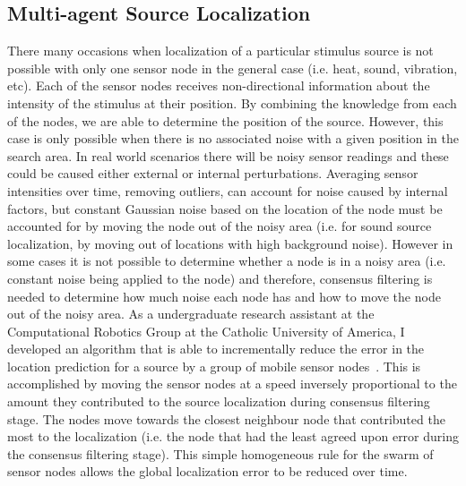 \documentclass{article}
\begin{document}
\subsection{Multi-agent Source Localization~\cite{malt}}

There many occasions when localization of a particular stimulus source is not
possible with only one sensor node in the general case (i.e. heat, sound,
vibration, etc). Each of the sensor nodes receives non-directional information
about the intensity of the stimulus at their position. By combining the
knowledge from each of the nodes, we are able to determine the position of the
source. However, this case is only possible when there is no associated noise
with a given position in the search area. In real world scenarios there will be
noisy sensor readings and these could be caused either external or internal
perturbations. Averaging sensor intensities over time, removing outliers, can
account for noise caused by internal factors, but constant Gaussian noise based
on the location of the node must be accounted for by moving the node out of the
noisy area (i.e. for sound source localization, by moving out of locations with
high background noise). However in some cases it is not possible to determine
whether a node is in a noisy area (i.e. constant noise being applied to the
node) and therefore, consensus filtering is needed to determine how much noise
each node has and how to move the node out of the noisy area. As a
undergraduate research assistant at the Computational Robotics Group at the
Catholic University of America, I developed an algorithm that is able to
incrementally reduce the error in the location prediction for a source by a
group of mobile sensor nodes~\cite{malt}.  This is accomplished by moving the
sensor nodes at a speed inversely proportional to the amount they contributed
to the source localization during consensus filtering stage. The nodes move
towards the closest neighbour node that contributed the most to the
localization (i.e. the node that had the least agreed upon error during the
consensus filtering stage). This simple homogeneous rule for the swarm of
sensor nodes allows the global localization error to be reduced over time.
\end{document}
